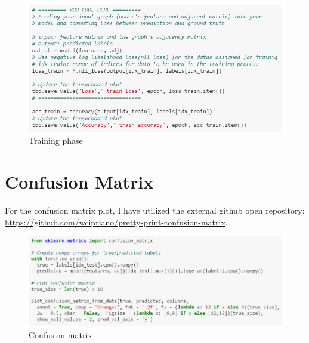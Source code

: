 \begin{figure}[htbp]
\centering
\includegraphics[width=0.6\linewidth]{implementation/fig/code6.png}
\caption{Training phase}
\label{fig:code6}
\end{figure}

\section{Confusion Matrix}

For the confusion matrix plot, I have utilized the external github open repository: \url{https://github.com/wcipriano/pretty-print-confusion-matrix}.

\begin{figure}[htbp]
\centering
\includegraphics[width=0.6\linewidth]{implementation/fig/code7.png}
\caption{Confusion matrix}
\label{fig:code7}
\end{figure}